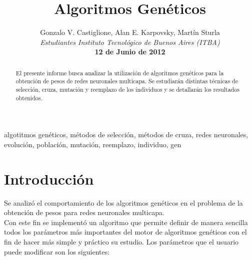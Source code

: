 \documentclass[%
    final,
    reprint,
    notitlepage,
    narroweqnarray,
    inline,
    twoside,
    invited
    ]{ieee}
\begin{document}
\title[Algoritmos Genéticos]{%
       Algoritmos Genéticos}

\author[Castiglione, Karpovsky, Sturla]{Gonzalo V. Castiglione, Alan E. Karpovsky, Martín Sturla\\\textit{Estudiantes 
       Instituto Tecnológico de Buenos Aires (ITBA)}\\
\textbf{12 de Junio de 2012}
}


\lognumber{}
\pubitemident{}


\maketitle               

\begin{abstract} 
El presente informe busca analizar la utilización de algoritmos genéticos para la obtención de pesos de redes neuronales multicapa. Se estudiarán distintas técnicas de selección, cruza, mutación y reemplazo de los individuos y se detallarán los resultados obtenidos.
\end{abstract}

\begin{keywords}
algotitmos genéticos, métodos de selección, métodos de cruza, redes neuronales, evolución, población, mutación, reemplazo, individuo, gen
\end{keywords}

\section{Introducción}

\par Se analizó el comportamiento de los algoritmos genéticos en el problema de la obtención de pesos para redes neuronales multicapa.\\
Con este fin se implementó un algoritmo que permite definir de manera sencilla todos los parámetros más importantes del motor de algoritmos genéticos con el fin de hacer más simple y práctico su estudio. Los parámetros que el usuario puede modificar son los siguientes:\\
\end{document}

